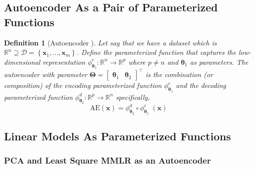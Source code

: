\documentclass[12pt]{article}
\newtheorem{definition}{Definition}
\begin{document}
\subsection{Autoencoder As a Pair of Parameterized Functions}
\begin{definition}[Autoencoder \citep{ae}]
Let say that we have a dataset which is $\mathbb{R}^{n} \supseteq \mathcal{D} = \left\{\mathbf{x}_1,\dots,\mathbf{x}_m\right\}$. Define the parameterized function that captures the low-dimensional representation $\phi_{\boldsymbol{\theta}_1}^{e}:\mathbb{R}^n\rightarrow \mathbb{R}^{p}$ where $p \neq n$ and $\boldsymbol{\theta}_1$ as parameters. The autoencoder with parameter $\boldsymbol{\Theta} = \begin{bmatrix}
    \boldsymbol{\theta}_1 & \boldsymbol{\theta}_2
\end{bmatrix}^\top$
is the combination (or composition) of the encoding parameterized function $\phi_{\boldsymbol{\theta}_1}^e$ and the decoding parameterized function $\phi_{\boldsymbol{\theta}_2}^{d}: \mathbb{R}^p\rightarrow\mathbb{R}^n$ specifically,
$$
\text{AE}(\mathbf{x}) = \phi_{\boldsymbol{\theta}_2}^d \circ \phi_{\boldsymbol{\theta}_1}^e \; (\mathbf{x})$$
\end{definition}

\subsection{Linear Models As Parameterized Functions}
\subsubsection{PCA and Least Square MMLR as an Autoencoder}
\end{document}

